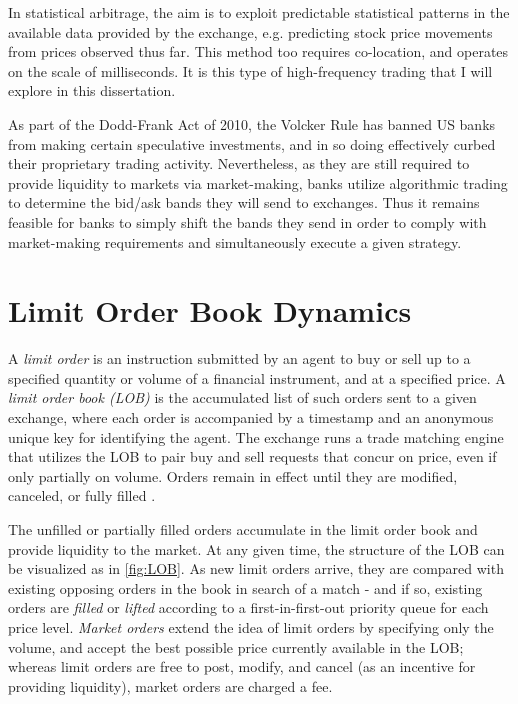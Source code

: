 In statistical arbitrage, the aim is to exploit predictable statistical patterns in the available data provided by the exchange, e.g. predicting stock price movements from prices observed thus far. This method too requires co-location, and operates on the scale of milliseconds. It is this type of high-frequency trading that I will explore in this dissertation. 

As part of the Dodd-Frank Act of 2010, the Volcker Rule has banned US banks from making certain speculative investments, and in so doing effectively curbed their proprietary trading activity. Nevertheless, as they are still required to provide liquidity to markets via market-making, banks utilize algorithmic trading to determine the bid/ask bands they will send to exchanges. Thus it remains feasible for banks to simply shift the bands they send in order to comply with market-making requirements and simultaneously execute a given strategy.

\section{Limit Order Book Dynamics}

A \emph{limit order} is an instruction submitted by an agent to buy or sell up to a specified quantity or volume of a financial instrument, and at a specified price. A \emph{limit order book (LOB)} is the accumulated list of such orders sent to a given exchange, where each order is accompanied by a timestamp and an anonymous unique key for identifying the agent. The exchange runs a trade matching engine that utilizes the LOB to pair buy and sell requests that concur on price, even if only partially on volume. Orders remain in effect until they are modified, canceled, or fully filled \citep{Kyle1989}.

The unfilled or partially filled orders accumulate in the limit order book and provide liquidity to the market. At any given time, the structure of the LOB can be visualized as in \autoref{fig:LOB}. As new limit orders arrive, they are compared with existing opposing orders in the book in search of a match - and if so, existing orders are \emph{filled} or \emph{lifted} according to a first-in-first-out priority queue for each price level. \emph{Market orders} extend the idea of limit orders by specifying only the volume, and accept the best possible price currently available in the LOB; whereas limit orders are free to post, modify, and cancel (as an incentive for providing liquidity), market orders are charged a fee.

